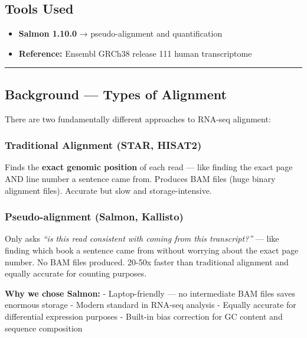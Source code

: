 \documentclass[
]{article}
\providecommand{\tightlist}{%
  \setlength{\itemsep}{0pt}\setlength{\parskip}{0pt}}
\begin{document}
\subsection{Tools Used}\label{tools-used-1}

\begin{itemize}
\tightlist
\item
  \textbf{Salmon 1.10.0} → pseudo-alignment and quantification
\item
  \textbf{Reference:} Ensembl GRCh38 release 111 human transcriptome
\end{itemize}

\begin{center}\rule{0.5\linewidth}{0.5pt}\end{center}

\subsection{Background --- Types of
Alignment}\label{background-types-of-alignment}

There are two fundamentally different approaches to RNA-seq alignment:

\subsubsection{Traditional Alignment (STAR,
HISAT2)}\label{traditional-alignment-star-hisat2}

Finds the \textbf{exact genomic position} of each read --- like finding
the exact page AND line number a sentence came from. Produces BAM files
(huge binary alignment files). Accurate but slow and storage-intensive.

\subsubsection{Pseudo-alignment (Salmon,
Kallisto)}\label{pseudo-alignment-salmon-kallisto}

Only asks \emph{``is this read consistent with coming from this
transcript?''} --- like finding which book a sentence came from without
worrying about the exact page number. No BAM files produced. 20-50x
faster than traditional alignment and equally accurate for counting
purposes.

\textbf{Why we chose Salmon:} - Laptop-friendly --- no intermediate BAM
files saves enormous storage - Modern standard in RNA-seq analysis -
Equally accurate for differential expression purposes - Built-in bias
correction for GC content and sequence composition
\end{document}
